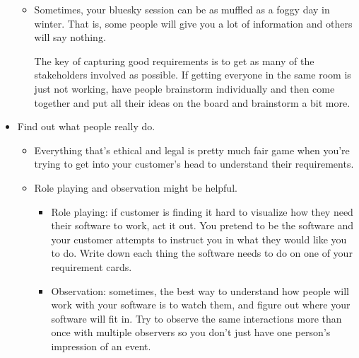 \documentclass[letterpaper]{article}
\begin{document}
\begin{itemize}
\begin{itemize}
        \item Sometimes, your bluesky session can be as muffled as a foggy day in winter. That is, some people will give you a lot of information and others will say nothing. 
        
        \begin{mdframed}
            The key of capturing good requirements is to get as many of the stakeholders involved as possible. If getting everyone in the same room is just not working, have people brainstorm individually and then come together and put all their ideas on the board and brainstorm a bit more. 
        \end{mdframed}
    \end{itemize}

    \item Find out what people really do. 
    \begin{itemize}
        \item Everything that's ethical and legal is pretty much fair game when you're trying to get into your customer's head to understand their requirements. 
        \item Role playing and observation might be helpful. 
        \begin{itemize}
            \item Role playing: if customer is finding it hard to visualize how they need their software to work, act it out. You pretend to be the software and your customer attempts to instruct you in what they would like you to do. Write down each thing the software needs to do on one of your requirement cards. 
            \item Observation: sometimes, the best way to understand how people will work with your software is to watch them, and figure out where your software will fit in. Try to observe the same interactions more than once with multiple observers so you don't just have one person's impression of an event. 
        \end{itemize}
    \end{itemize}


\end{itemize}
\end{document}
